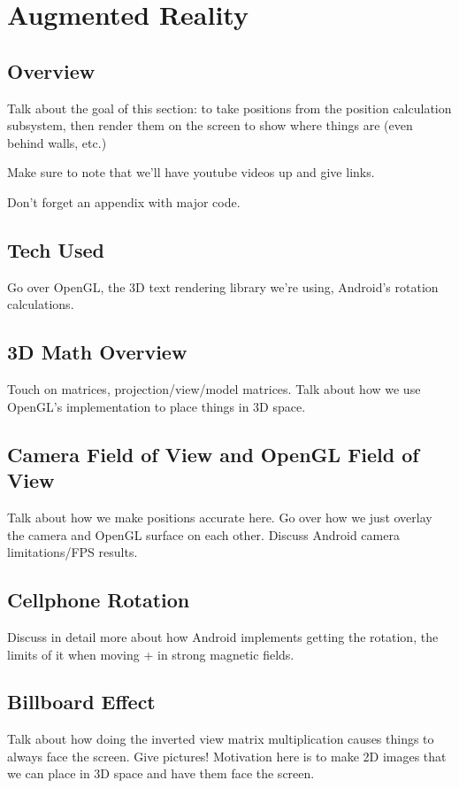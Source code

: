 
\chapter{Augmented Reality} %

\label{AugmentedReality}


\section{Overview}
Talk about the goal of this section: to take positions from the position calculation subsystem, then render them on the screen to show where things are (even behind walls, etc.)

Make sure to note that we'll have youtube videos up and give links.

Don't forget an appendix with major code.

\section{Tech Used}
Go over OpenGL, the 3D text rendering library we're using, Android's rotation calculations.

\section{3D Math Overview}
Touch on matrices, projection/view/model matrices. Talk about how we use OpenGL's implementation to place things in 3D space.

\section{Camera Field of View and OpenGL Field of View}
Talk about how we make positions accurate here. Go over how we just overlay the camera and OpenGL surface on each other. Discuss Android camera limitations/FPS results.

\section{Cellphone Rotation}
Discuss in detail more about how Android implements getting the rotation, the limits of it when moving + in strong magnetic fields.

\section{Billboard Effect}
Talk about how doing the inverted view matrix multiplication causes things to always face the screen. Give pictures! Motivation here is to make 2D images that we can place in 3D space and have them face the screen.

